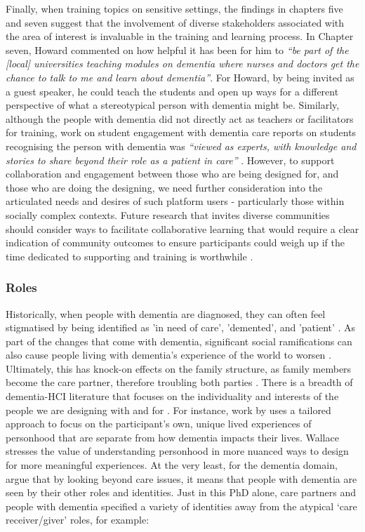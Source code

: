 Finally, when training topics on sensitive settings, the findings in chapters five and seven suggest that the involvement of diverse stakeholders associated with the area of interest is invaluable in the training and learning process. In Chapter seven, Howard commented on how helpful it has been for him to \textit{``be part of the [local] universities teaching modules on dementia where nurses and doctors get the chance to talk to me and learn about dementia''}. For Howard, by being invited as a guest speaker, he could teach the students and open up ways for a different perspective of what a stereotypical person with dementia might be. Similarly, although the people with dementia did not directly act as teachers or facilitators for training, \cite{foley_student_2020} work on student engagement with dementia care reports on students recognising the person with dementia was \textit{``viewed as experts, with knowledge and stories to share beyond their role as a patient in care''} \citep[pg. 9]{foley_student_2020}. However, to support collaboration and engagement between those who are being designed for, and those who are doing the designing, we need further consideration into the articulated needs and desires of such platform users - particularly those within socially complex contexts. Future research that invites diverse communities should consider ways to facilitate collaborative learning that would require a clear indication of community outcomes to ensure participants could weigh up if the time dedicated to supporting and training is worthwhile \citep{hayes2020inclusive}.

\subsubsection{Roles}
\label{Roles}
Historically, when people with dementia are diagnosed, they can often feel stigmatised by being identified as ’in need of care’, ’demented’, and ’patient’ \citep{benbow_dementia_2012}. As part of the changes that come with dementia, significant social ramifications can also cause people living with dementia’s experience of the world to worsen \citep{hampson_dementia:_2016}. Ultimately, this has knock-on effects on the family structure, as family members become the care partner, therefore troubling both parties \citep{lee_technology-based_2015}. There is a breadth of dementia-HCI literature that focuses on the individuality and interests of the people we are designing with and for \citep{lazar_rethinking_2016,brankaert_intersections_2019,foley_printer_2019,mcnaney_demyouth:_2017}. For instance, work by \cite{wallace_design-led_2013} uses a tailored approach to focus on the participant's own, unique lived experiences of personhood that are separate from how dementia impacts their lives. Wallace stresses the value of understanding personhood in more nuanced ways to design for more meaningful experiences. At the very least, for the dementia domain, \cite{bartlett2010broadening} argue that by looking beyond care issues, it means that people with dementia are seen by their other roles and identities. Just in this PhD alone, care partners and people with dementia specified a variety of identities away from the atypical `care receiver/giver' roles, for example:

